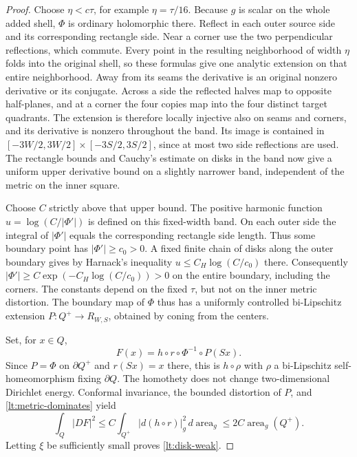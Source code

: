 \begin{proof}
Choose $\eta<c\tau$, for example $\eta=\tau/16$.
Because $g$ is scalar on the whole added shell, $\Phi$ is ordinary
holomorphic there.  Reflect in each outer source side and its
corresponding rectangle side.  Near a corner use the two perpendicular
reflections, which commute.  Every point in the resulting neighborhood
of width $\eta$ folds into the original shell, so these formulas give
one analytic extension on that entire neighborhood.  Away from its
seams the derivative is an original nonzero derivative or its conjugate.
Across a side the reflected halves map to opposite half-planes, and
at a corner the four copies map into the four distinct target
quadrants.  The extension is therefore locally injective also on
seams and corners, and its derivative is nonzero throughout the band.
Its image is contained in
$[-3W/2,3W/2]\times[-3S/2,3S/2]$, since at most two side reflections
are used.  The rectangle bounds and Cauchy's estimate on disks in the
band now give a uniform upper derivative bound on a slightly narrower
band, independent of the metric on the inner square.

Choose $C$ strictly above that upper bound.  The positive harmonic
function $u=\log(C/|\Phi'|)$ is defined on this fixed-width band.
On each outer side the integral of $|\Phi'|$ equals the corresponding
rectangle side length.  Thus some boundary point has
$|\Phi'|\geq c_0>0$.  A fixed finite chain of disks along the outer
boundary gives by Harnack's inequality
$u\leq C_H\log(C/c_0)$ there.  Consequently
$|\Phi'|\geq C\exp(-C_H\log(C/c_0))>0$ on the entire boundary,
including the corners.  The constants depend on the fixed $\tau$,
but not on the inner metric distortion.  The boundary map of
$\Phi$ thus has a uniformly controlled bi-Lipschitz extension
$P:Q^+\to R_{W,S}$, obtained by coning from the centers.

Set, for $x\in Q$,
\[
 F(x)=h\circ r\circ\Phi^{-1}\circ P(Sx).
\]
Since $P=\Phi$ on $\partial Q^+$ and $r(Sx)=x$ there, this is
$h\circ\rho$ with $\rho$ a bi-Lipschitz self-homeomorphism fixing
$\partial Q$.  The homothety does not change two-dimensional
Dirichlet energy.  Conformal invariance, the bounded distortion of
$P$, and \eqref{lt:metric-dominates} yield
\[
 \int_Q|DF|^2
 \leq C\int_{Q^+}|d(h\circ r)|_g^2\,d\operatorname{area}_g
 \leq 2C\operatorname{area}_g(Q^+).
\]
Letting $\xi$ be sufficiently small proves \eqref{lt:disk-weak}.


\end{proof}
